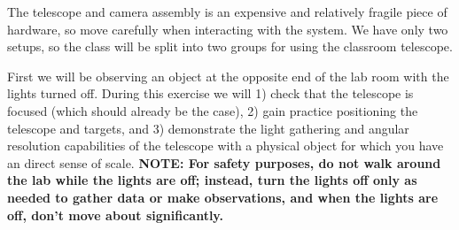 The telescope and camera assembly is an expensive and relatively fragile piece of hardware, so
move carefully when interacting with the system. We have only two setups, so the class will be split into two groups for using the classroom telescope.

First we will be observing an object at the opposite end of the lab room with the lights turned off. During this exercise we will 1) check that the telescope is focused (which should already be the case), 2) gain practice positioning the telescope and targets, and 3) demonstrate the light gathering and angular resolution capabilities of the telescope with a physical object for which you have an direct sense of scale. \textbf{NOTE: For safety purposes, do not walk around the
	lab while the lights are off; instead, turn the lights off only as needed to gather data
	or make observations, and when the lights are off, don’t move about significantly.}

